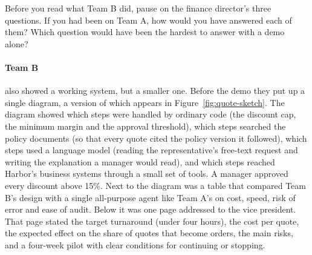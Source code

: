 

\begin{thinkabout}
Before you read what Team B did, pause on the finance director's three questions. If you had been on Team A, how would you have answered each of them? Which question would have been the hardest to answer with a demo alone?
\end{thinkabout}

\paragraph{Team B} also showed a working system, but a smaller one. Before the demo they put up a single diagram, a version of which appears in Figure~\ref{fig:quote-sketch}. The diagram showed which steps were handled by ordinary code (the discount cap, the minimum margin and the approval threshold), which steps searched the policy documents (so that every quote cited the policy version it followed), which steps used a language model (reading the representative's free-text request and writing the explanation a manager would read), and which steps reached Harbor's business systems through a small set of tools. A manager approved every discount above 15\%. Next to the diagram was a table that compared Team B's design with a single all-purpose agent like Team A's on cost, speed, risk of error and ease of audit. Below it was one page addressed to the vice president. That page stated the target turnaround (under four hours), the cost per quote, the expected effect on the share of quotes that become orders, the main risks, and a four-week pilot with clear conditions for continuing or stopping.

